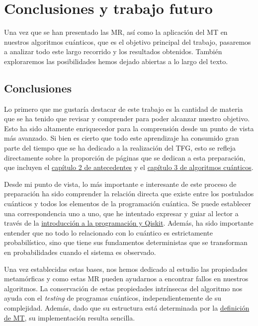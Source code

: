 \cleardoublepage

\chapter{Conclusiones y trabajo futuro}
\label{Cap5:Conclusion}
 Una vez que se han presentado las MR, así como la aplicación del MT en nuestros algoritmos cuánticos, que es el objetivo principal del trabajo, pasaremos a analizar todo este largo recorrido y los resultados obtenidos. También exploraremos las posibilidades hemos dejado abiertas a lo largo del texto.

 
\section{Conclusiones}
\label{Sec5.1:Conclusion}

Lo primero que me gustaría destacar de este trabajo es la cantidad de materia que se ha tenido que revisar y comprender para poder alcanzar nuestro objetivo. Esto ha sido altamente enriquecedor para la comprensión desde un punto de vista más avanzado. Si bien es cierto que todo este aprendizaje ha consumido gran parte del tiempo que se ha dedicado a la realización del TFG, esto se refleja directamente sobre la proporción de páginas que se dedican a esta preparación, que incluyen el  \hyperref[Cap2:Antecedentes]{capítulo 2 de antecedentes} y el \hyperref[Cap3:Algoritmos]{capítulo 3 de algoritmos cuánticos}.\newline

Desde mi punto de vista, lo más importante e interesante de este proceso de preparación ha sido comprender la relación directa que existe entre los postulados cuánticos y todos los elementos de la programación cuántica. Se puede establecer una correspondencia uno a uno, que he intentado expresar y guiar al lector a través de la \hyperref[Sec2.3:Qiskit]{introducción a la programación y Qiskit}.  Además, ha sido importante entender que no todo lo relacionado con lo cuántico es estrictamente probabilístico, sino que tiene sus fundamentos deterministas que se transforman en probabilidades cuando el sistema es observado. \newline

Una vez establecidas estas bases, nos hemos dedicado al estudio las propiedades metamórficas y como estas MR pueden ayudarnos a encontrar fallos en nuestros algoritmos. La conservación de estas propiedades intrínsecas del algoritmo nos ayuda con el \textit{testing} de programas cuánticos, independientemente de su complejidad. Además, dado que su estructura está determinada por la \hyperref[Def:MT]{definición de MT}, su implementación resulta sencilla.\newline

